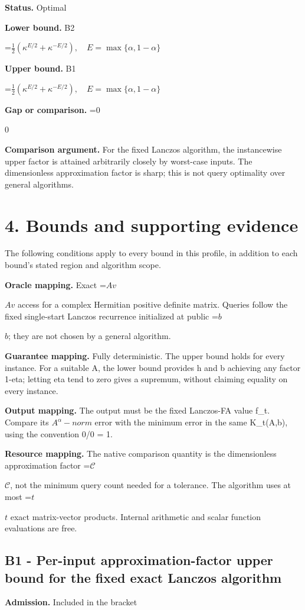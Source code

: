 \documentclass[10pt,a4paper]{article}
\newcommand{\AtlasMath}[1]{\par\begingroup\centering\setbox0=\hbox{$\displaystyle #1$}\ifdim\wd0>1.4\linewidth\typeout{ATLAS WIDE FORMULA: \the\wd0}\fi\ifdim\wd0>\linewidth\resizebox{\linewidth}{!}{\box0}\else\box0\fi\par\endgroup}
\newcommand{\AtlasInlineMath}[1]{\begingroup\setbox0=\hbox{$#1$}\ifdim\wd0>.4\linewidth\endgroup\AtlasMath{#1}\else\endgroup$#1$\fi}
\begin{document}
\textbf{Status.} Optimal

\textbf{Lower bound.} B2

\AtlasMath{\frac12(\kappa^{E/2}+\kappa^{-E/2}),\quad E=\max\{\alpha,1-\alpha\}}
\textbf{Upper bound.} B1

\AtlasMath{\frac12(\kappa^{E/2}+\kappa^{-E/2}),\quad E=\max\{\alpha,1-\alpha\}}
\textbf{Gap or comparison.} \AtlasInlineMath{0}

\textbf{Comparison argument.} For the fixed Lanczos algorithm, the instancewise upper factor is attained arbitrarily closely by worst-case inputs. The dimensionless approximation factor is sharp; this is not query optimality over general algorithms.

\section{4. Bounds and supporting evidence}
The following conditions apply to every bound in this profile, in addition to each bound's stated region and algorithm scope.

\textbf{Oracle mapping.} Exact \AtlasInlineMath{Av} access for a complex Hermitian positive definite matrix. Queries follow the fixed single-start Lanczos recurrence initialized at public \AtlasInlineMath{b}; they are not chosen by a general algorithm.

\textbf{Guarantee mapping.} Fully deterministic. The upper bound holds for every instance. For a suitable A, the lower bound provides h and b achieving any factor 1-eta; letting eta tend to zero gives a supremum, without claiming equality on every instance.

\textbf{Output mapping.} The output must be the fixed Lanczos-FA value f\_t. Compare its $A^\alpha -norm$ error with the minimum error in the same K\_t(A,b), using the convention 0/0 = 1.

\textbf{Resource mapping.} The native comparison quantity is the dimensionless approximation factor \AtlasInlineMath{\mathcal C}, not the minimum query count needed for a tolerance. The algorithm uses at most \AtlasInlineMath{t} exact matrix-vector products. Internal arithmetic and scalar function evaluations are free.

\subsection{B1 - Per-input approximation-factor upper bound for the fixed exact Lanczos algorithm}
\textbf{Admission.} Included in the bracket
\end{document}

